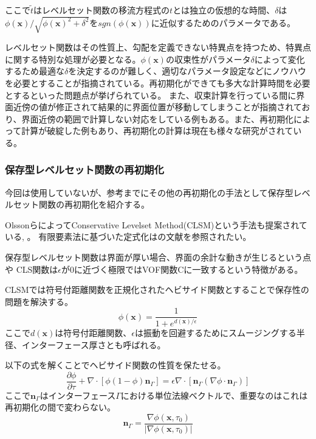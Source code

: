 ここで$\tilde{t}$はレベルセット関数の移流方程式の$t$とは独立の仮想的な時間、$\delta$は$\phi(\bm{x})/\sqrt{\phi(\bm{x})^2+\delta^2}$を$sgn(\phi(\bm{x}))$に近似するためのパラメータである。

レベルセット関数はその性質上、勾配を定義できない特異点を持つため、特異点に関する特別な処理が必要となる。$\phi(\bm{x})$の収束性がパラメータ$\delta$によって変化するため最適な$\delta$を決定するのが難しく、適切なパラメータ設定などにノウハウを必要とすることが指摘されている。再初期化ができても多大な計算時間を必要とするといった問題点が挙げられている\cite{Yamazaki2007}。
また、収束計算を行っている間に界面近傍の値が修正されて結果的に界面位置が移動してしまうことが指摘されており、界面近傍の範囲で計算しない対応をしている例もある\cite{Tsubogo2003}。また、再初期化によって計算が破綻した例もあり\cite{Shono2017}、再初期化の計算は現在も様々な研究がされている。

\subsubsection{保存型レベルセット関数の再初期化}
今回は使用していないが、参考までにその他の再初期化の手法として保存型レベルセット関数の再初期化を紹介する。

OlssonらによってConservative Levelset Method(CLSM)という手法も提案されている\cite{Olsson2005}, \cite{Olsson2007}。
有限要素法に基づいた定式化は\cite{Pimenta2018}の文献を参照されたい。

保存型レベルセット関数は界面が厚い場合、界面の余計な動きが生じるという点や\cite{Takeuchi2018}
CLS関数は$\epsilon$が0に近づく極限ではVOF関数Cに一致するという特徴がある\cite{Nakazawa2023}。

CLSMでは符号付距離関数を正規化されたヘビサイド関数とすることで保存性の問題を解決する。
\begin{equation}
\label{CLSM-heaviside}
	\phi(\bm{x}) = \frac{1}{1+e^{d(\bm{x})/\epsilon}}
\end{equation}
ここで$d(\bm{x})$は符号付距離関数、$\epsilon$は振動を回避するためにスムージングする半径、インターフェース厚さとも呼ばれる。

以下の式を解くことでヘビサイド関数の性質を保たせる。\cite{Olsson2007}
\begin{equation}
\label{CLSM-reinitialization}
	\frac{\partial \phi}{\partial \tau} + \nabla \cdot [\phi(1-\phi)\bm{n}_{\Gamma}] = \epsilon \nabla \cdot [\bm{n}_{\Gamma}(\nabla \phi \cdot \bm{n}_{\Gamma})]
\end{equation}
ここで$\bm{n}_{\Gamma}$はインターフェース$\Gamma$における単位法線ベクトルで、重要なのはこれは再初期化の間で変わらない。
\begin{equation}
\label{CLSM-n}
	\bm{n}_{\Gamma} = \frac{\nabla \phi (\bm{x}, \tau_0)}{|\nabla \phi (\bm{x}, \tau_0)|}
\end{equation}

